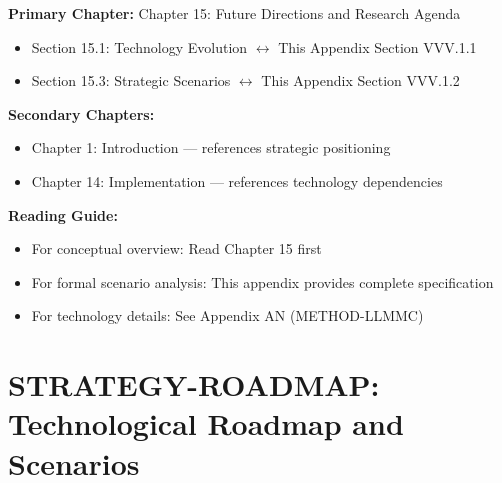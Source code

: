 \begin{tcolorbox}[colback=purple!5!white, colframe=purple!75!black,
    title=Chapter Linkage]

\textbf{Primary Chapter:} Chapter 15: Future Directions and Research Agenda
\begin{itemize}[nosep]
\item Section 15.1: Technology Evolution $\leftrightarrow$ This Appendix Section VVV.1.1
\item Section 15.3: Strategic Scenarios $\leftrightarrow$ This Appendix Section VVV.1.2
\end{itemize}

\textbf{Secondary Chapters:}
\begin{itemize}[nosep]
\item Chapter 1: Introduction --- references strategic positioning
\item Chapter 14: Implementation --- references technology dependencies
\end{itemize}

\textbf{Reading Guide:}
\begin{itemize}[nosep]
\item For conceptual overview: Read Chapter 15 first
\item For formal scenario analysis: This appendix provides complete specification
\item For technology details: See Appendix AN (METHOD-LLMMC)
\end{itemize}

\end{tcolorbox}

\chapter{STRATEGY-ROADMAP: Technological Roadmap and Scenarios}
\label{app:vvv1-roadmap}

\begin{abstract}
This appendix analyzes technological evolution scenarios for EBF deployment
from 2024 to 2030+. We identify three axes of uncertainty (AI capability,
behavioral AI market maturity, platform landscape) and derive four archetypal
scenarios: Golden Window, Red Ocean, Slow Burn, and Platform Play. Each
scenario implies different strategic priorities for framework deployment,
partnership formation, and product development. The analysis connects to the
EBF context framework ($\Psi$) by treating technological and market conditions
as external context that shapes optimal strategy.
\end{abstract}

